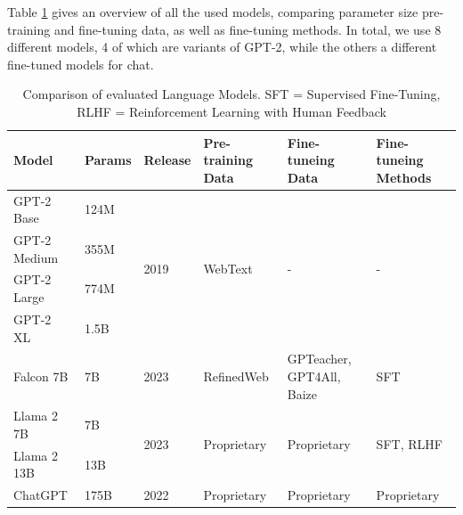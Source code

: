 Table \ref{tab:language-models} gives an overview of all the used models, comparing parameter size pre-training and fine-tuning data, as well as fine-tuning methods.
In total, we use 8 different models, 4 of which are variants of GPT-2, while the others a different fine-tuned models for chat.
\begin{table}[tb]
\centering
\begin{tabularx}{\textwidth}{lllXXX}
\hline
\textbf{Model} & \textbf{Params} & \textbf{Release} & \textbf{Pre-training Data} & \textbf{Fine-tuneing Data} & \textbf{Fine-tuneing Methods} \\
\hline
GPT-2 Base    & 124M & \multirow{4}{*}{2019} & \multirow{4}{*}{WebText} & \multirow{4}{*}{-} & \multirow{4}{*}{-} \\
GPT-2 Medium  & 355M &                      &                          &  &  \\
GPT-2 Large   & 774M &                      &                          &  &  \\
GPT-2 XL      & 1.5B &                      &                          &  &  \\
\hline
Falcon 7B              & 7B      & 2023 & RefinedWeb           & GPTeacher, GPT4All, Baize & SFT \\
\hline
Llama 2 7B & 7B    & \multirow{2}{*}{2023} & \multirow{2}{*}{Proprietary} & \multirow{2}{*}{Proprietary} & \multirow{2}{*}{SFT, RLHF} \\
Llama 2 13B   & 13B   &  &                        &                         &  \\
\hline
ChatGPT                & 175B   & 2022 & Proprietary                & Proprietary & Proprietary \\
\hline
\end{tabularx}
\caption{Comparison of evaluated Language Models. SFT = Supervised Fine-Tuning, RLHF = Reinforcement Learning with Human Feedback}\label{tab:language-models}
\end{table}

